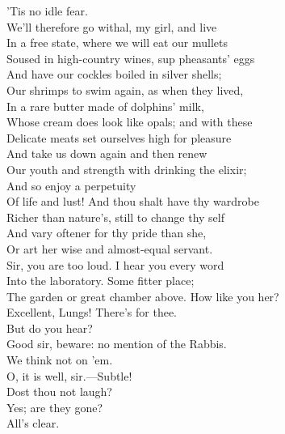 \documentclass[a4paper,oneside,12pt]{memoir}
\begin{document}
\begin{drama*}
\mammonspeaks {} 'Tis no idle fear.\\
We'll therefore go withal, my girl, and live\\
In a free state, where we will eat our mullets\\
Soused in high-country wines, sup pheasants' eggs\\
And have our cockles boiled in silver shells;\\
Our shrimps to swim again, as when they lived,\\
In a rare butter made of dolphins' milk,\\
Whose cream does look like opals; and with these\\
Delicate meats set ourselves high for pleasure\\
And take us down again and then renew\\
Our youth and strength with drinking the elixir;\\
And so enjoy a perpetuity\\
Of life and lust! And thou shalt have thy wardrobe\\
Richer than nature's, still to change thy self\\
And vary oftener for thy pride than she,\\
Or art her wise and almost-equal servant.\\
\facespeaks Sir, you are too loud. I hear you every word\\
Into the laboratory. Some fitter place;\\
The garden or great chamber above. How like you her?\\
\mammonspeaks Excellent, Lungs! There's for thee.\\
\facespeaks {} But do you hear?\\
Good sir, beware: no mention of the Rabbis.\\
\mammonspeaks We think not on 'em.\\
\facespeaks {} O, it is well, sir.---Subtle!\\
Dost thou not laugh?\\
\subtlespeaks {} Yes; are they gone?\\
\facespeaks {} All's clear.\\


\end{drama*}
\end{document}
